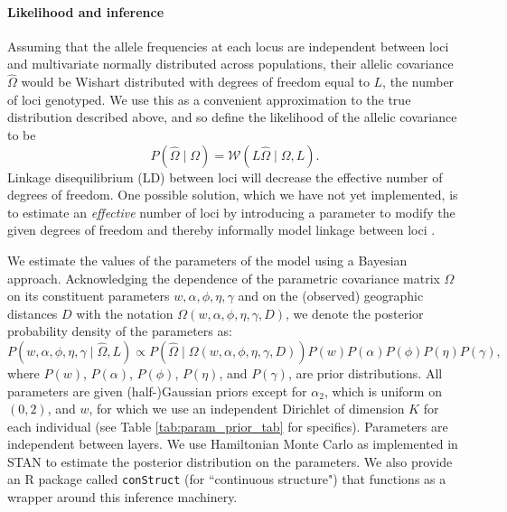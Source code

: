 \documentclass[12pt]{article}
\begin{document}
\paragraph{Likelihood and inference}
Assuming that the allele frequencies at each locus
are independent between loci and multivariate normally distributed across populations, 
their allelic covariance $\widehat{\Omega}$ 
would be Wishart distributed with degrees of freedom equal to $L$, 
the number of loci genotyped.
We use this as a convenient approximation to the true distribution described above,
and so define the likelihood of the allelic covariance to be
\begin{equation}
P(\widehat{\Omega} \; | \; \Omega) = \mathcal{W} \left( L\widehat{\Omega} \; | \; \Omega,L\right) .
\end{equation}
Linkage disequilibrium (LD) between loci will decrease the effective
number of degrees of freedom.  
One possible solution, which we have not yet implemented, 
is to estimate an \emph{effective} number of loci 
by introducing a parameter to modify the given degrees of freedom 
and thereby informally model linkage between loci \citep[e.g.][]{EEMS}.

We estimate the values of the parameters of the model using a Bayesian approach.
Acknowledging the dependence of the parametric covariance matrix $\Omega$ on its constituent parameters
$w,\alpha,\phi,\eta,\gamma$ and on the (observed) geographic distances $D$ 
with the notation $\Omega(w,\alpha,\phi,\eta,\gamma,D)$,
we denote the posterior probability density of the parameters as:
\begin{equation}
P\left( w,\alpha,\phi,\eta,\gamma \;	| \; \widehat{\Omega}, L \right) \propto
P\left(\widehat{\Omega} \; | \; \Omega(w,\alpha,\phi,\eta,\gamma,D) \right)
P(w)P(\alpha)P(\phi)P(\eta)P(\gamma) ,
\end{equation}
where $P(w)$, $P(\alpha)$, $P(\phi)$, $P(\eta)$, and $P(\gamma)$, are prior distributions.
All parameters are given (half-)Gaussian priors 
except for $\alpha_2$, which is uniform on $(0,2)$, 
and $w$, for which we use an independent Dirichlet of dimension $K$ for each individual
(see Table \ref{tab:param_prior_tab} for specifics).
Parameters are independent between layers.
We use Hamiltonian Monte Carlo as implemented in STAN \citep{stan, NUTS, stan_lib, rstan} 
to estimate the posterior distribution on the parameters.
We also provide an R package \citep{R} called \texttt{conStruct} 
(for ``continuous structure") that functions as a wrapper around this inference machinery.
\end{document}
